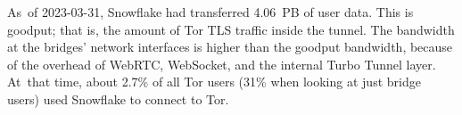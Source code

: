 \documentclass[letterpaper,twocolumn]{article}
\begin{document}
As~of \mbox{2023-03-31},
Snowflake had transferred 4.06~PB of user data.
This is goodput; that is, the amount of Tor TLS traffic inside the tunnel.
The bandwidth at the bridges' network interfaces is
higher than the goodput bandwidth,
because of the overhead of WebRTC, WebSocket, and
the internal Turbo Tunnel layer.
At~that time, about 2.7\% of all Tor users
(31\% when looking at just bridge users) used Snowflake to connect to Tor.
\end{document}
